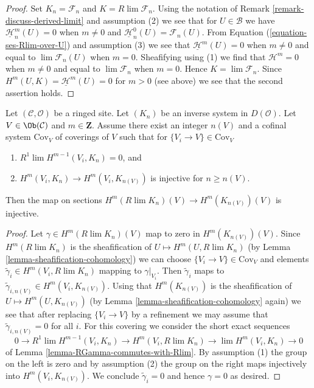 \begin{proof}
Set $K_n = \mathcal{F}_n$ and $K = R\lim \mathcal{F}_n$. Using the notation
of Remark \ref{remark-discuss-derived-limit} and assumption (2) we see that for
$U \in \mathcal{B}$ we have $\underline{\mathcal{H}}_n^m(U) = 0$
when $m \not = 0$ and $\underline{\mathcal{H}}_n^0(U) = \mathcal{F}_n(U)$.
From Equation (\ref{equation-ses-Rlim-over-U}) and assumption (3)
we see that $\underline{\mathcal{H}}^m(U) = 0$
when $m \not = 0$ and equal to $\lim \mathcal{F}_n(U)$
when $m = 0$. Sheafifying using (1) we find that
$\mathcal{H}^m = 0$ when $m \not = 0$ and equal to
$\lim \mathcal{F}_n$ when $m = 0$.
Hence $K = \lim \mathcal{F}_n$.
Since $H^m(U, K) = \underline{\mathcal{H}}^m(U) = 0$ for $m > 0$
(see above) we see that the second assertion holds.
\end{proof}

\begin{lemma}
\label{lemma-cohomology-derived-limit-injective}
Let $(\mathcal{C}, \mathcal{O})$ be a ringed site. Let $(K_n)$ be an
inverse system in $D(\mathcal{O})$. Let $V \in \Ob(\mathcal{C})$
and $m \in \mathbf{Z}$. Assume there exist an integer $n(V)$
and a cofinal system $\text{Cov}_V$ of coverings of $V$ such that
for $\{V_i \to V\} \in \text{Cov}_V$
\begin{enumerate}
\item $R^1\lim H^{m - 1}(V_i, K_n) = 0$, and
\item $H^m(V_i, K_n) \to H^m(V_i, K_{n(V)})$ is injective
for $n \geq n(V)$.
\end{enumerate}
Then the map on sections $H^m(R\lim K_n)(V) \to H^m(K_{n(V)})(V)$ is injective.
\end{lemma}

\begin{proof}
Let $\gamma \in H^m(R\lim K_n)(V)$ map to zero in
$H^m(K_{n(V)})(V)$. Since $H^m(R\lim K_n)$ is the sheafification of
$U \mapsto H^m(U, R\lim K_n)$ (by Lemma \ref{lemma-sheafification-cohomology})
we can choose $\{V_i \to V\} \in \text{Cov}_V$
and elements $\tilde\gamma_i \in H^m(V_i, R\lim K_n)$ mapping to
$\gamma|_{V_i}$.
Then $\tilde\gamma_i$ maps to $\tilde\gamma_{i, n(V)} \in H^m(V_i, K_{n(V)})$.
Using that $H^m(K_{n(V)})$ is the sheafification of
$U \mapsto H^m(U, K_{n(V)})$
(by Lemma \ref{lemma-sheafification-cohomology} again)
we see that after replacing $\{V_i \to V\}$ by a refinement
we may assume that $\tilde\gamma_{i, n(V)} = 0$ for all $i$.
For this covering we consider the short exact sequences
$$
0 \to
R^1\lim H^{m - 1}(V_i, K_n) \to H^m(V_i, R\lim K_n) \to
\lim H^m(V_i, K_n) \to 0
$$
of Lemma \ref{lemma-RGamma-commutes-with-Rlim}.
By assumption (1) the group on the left is zero and by
assumption (2) the group on the right maps injectively
into $H^m(V_i, K_{n(V)})$. We conclude $\tilde\gamma_i = 0$
and hence $\gamma = 0$ as desired.
\end{proof}

